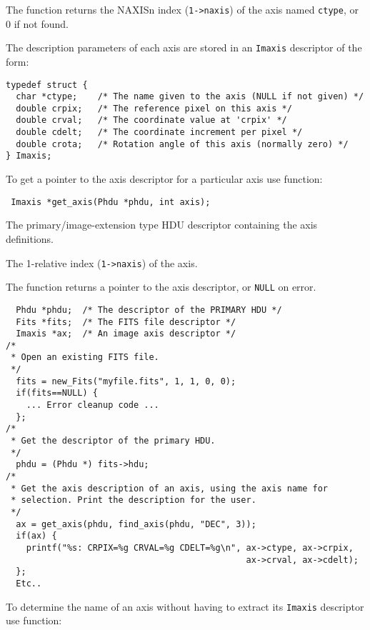 The function returns the NAXISn index (\verb`1->naxis`) of the axis named
\verb`ctype`, or 0 if not found.

The description parameters of each axis are stored in an \verb`Imaxis`
descriptor of the form:

\begin{verbatim}
typedef struct {
  char *ctype;    /* The name given to the axis (NULL if not given) */
  double crpix;   /* The reference pixel on this axis */
  double crval;   /* The coordinate value at 'crpix' */
  double cdelt;   /* The coordinate increment per pixel */
  double crota;   /* Rotation angle of this axis (normally zero) */
} Imaxis;
\end{verbatim}

To get a pointer to the axis descriptor for a particular axis use
function:

\label{get_axis}\begin{verbatim}
 Imaxis *get_axis(Phdu *phdu, int axis);
\end{verbatim}

\begin{arglist}

  The primary/image-extension type HDU descriptor
                    containing the axis definitions.

  The 1-relative index (\verb`1->naxis`) of the
                    axis.
\end{arglist}

The function returns a pointer to the axis descriptor, or \verb`NULL` on
error.


\begin{verbatim}
  Phdu *phdu;  /* The descriptor of the PRIMARY HDU */
  Fits *fits;  /* The FITS file descriptor */
  Imaxis *ax;  /* An image axis descriptor */
/*
 * Open an existing FITS file.
 */
  fits = new_Fits("myfile.fits", 1, 1, 0, 0);
  if(fits==NULL) {
    ... Error cleanup code ...
  };
/*
 * Get the descriptor of the primary HDU.
 */
  phdu = (Phdu *) fits->hdu;
/*
 * Get the axis description of an axis, using the axis name for
 * selection. Print the description for the user.
 */
  ax = get_axis(phdu, find_axis(phdu, "DEC", 3));
  if(ax) {
    printf("%s: CRPIX=%g CRVAL=%g CDELT=%g\n", ax->ctype, ax->crpix,
                                               ax->crval, ax->cdelt);
  };
  Etc..
\end{verbatim}

To determine the name of an axis without having to extract its
\verb`Imaxis` descriptor use function:

